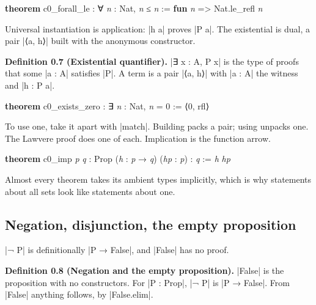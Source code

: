 \documentclass{memoir}
\begin{document}
\begin{LeanVerbatim}
\textbf{theorem} c0_forall_le : ∀ \textit{n} : Nat, \textit{n} ≤ \textit{n} :=
  \textbf{fun} \textit{n} => Nat.le_refl \textit{n}

\end{LeanVerbatim}


Universal instantiation is application: \LeanVerb|h a| proves \LeanVerb|P a|. The existential is
dual, a pair \LeanVerb|⟨a, h⟩| built with the anonymous constructor.

\textbf{Definition 0.7 (Existential quantifier).} \LeanVerb|∃ x : A, P x| is the type of proofs
that some \LeanVerb|a : A| satisfies \LeanVerb|P|. A term is a pair \LeanVerb|⟨a, h⟩| with \LeanVerb|a : A| the
witness and \LeanVerb|h : P a|.

\begin{LeanVerbatim}
\textbf{theorem} c0_exists_zero : ∃ \textit{n} : Nat, \textit{n} = 0 := ⟨0, rfl⟩

\end{LeanVerbatim}


To use one, take it apart with \LeanVerb|match|. Building packs a pair; using unpacks
one. The Lawvere proof does one of each. Implication is the function arrow.

\begin{LeanVerbatim}
\textbf{theorem} c0_imp \textit{p} \textit{q} : Prop (\textit{h} : \textit{p} → \textit{q}) (\textit{hp} : \textit{p}) : \textit{q} := \textit{h} \textit{hp}

\end{LeanVerbatim}


Almost every theorem takes its ambient types implicitly, which is why statements
about all sets look like statements about one.



\subsection{Negation, disjunction, the empty proposition}\label{Two--Schemas--of--Impossibility-005F-005F-005F--Machine--Checked--Limits--of--Trustworthy--Machine--Learning-005F-005F-005F--and--Why--They--Tighten--with--Capability----Preliminaries----How--to--read--the--Lean--4----Negation-005F-005F-005F--disjunction-005F-005F-005F--the--empty--proposition}

\LeanVerb|¬ P| is definitionally \LeanVerb|P → False|, and \LeanVerb|False| has no proof.

\textbf{Definition 0.8 (Negation and the empty proposition).} \LeanVerb|False| is the
proposition with no constructors. For \LeanVerb|P : Prop|, \LeanVerb|¬ P| is \LeanVerb|P → False|. From
\LeanVerb|False| anything follows, by \LeanVerb|False.elim|.
\end{document}
